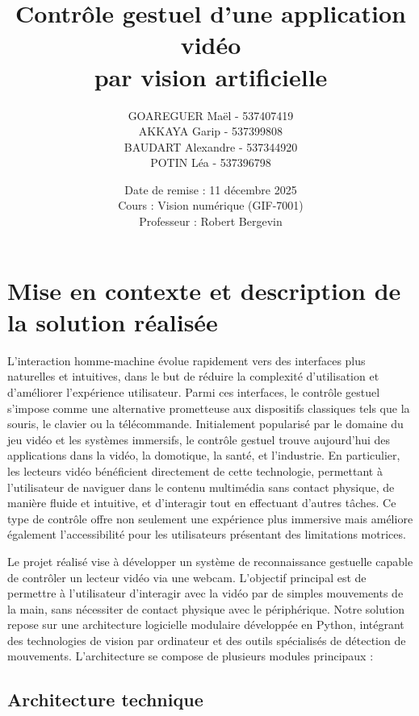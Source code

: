 \documentclass[12pt,a4paper]{article}
\title{%
    \vspace{-2cm}
    \textbf{Contrôle gestuel d'une application vidéo\\par vision artificielle}
    \vspace{0.5cm}
}
\author{%
    GOAREGUER Maël - 537407419\\
    AKKAYA Garip - 537399808\\
    BAUDART Alexandre - 537344920\\
    POTIN Léa - 537396798
}
\date{%
    \vspace{0.5cm}
    Date de remise : 11 décembre 2025\\
    \vspace{0.3cm}
    Cours : Vision numérique (GIF-7001)\\
    Professeur : Robert Bergevin
}
\begin{document}
\maketitle
\thispagestyle{empty}
\newpage

\tableofcontents
\newpage

\section{Mise en contexte et description de la solution réalisée}

L'interaction homme-machine évolue rapidement vers des interfaces plus naturelles et intuitives, dans le but de réduire la complexité d'utilisation et d'améliorer l'expérience utilisateur. Parmi ces interfaces, le contrôle gestuel s'impose comme une alternative prometteuse aux dispositifs classiques tels que la souris, le clavier ou la télécommande. Initialement popularisé par le domaine du jeu vidéo et les systèmes immersifs, le contrôle gestuel trouve aujourd'hui des applications dans la vidéo, la domotique, la santé, et l'industrie. En particulier, les lecteurs vidéo bénéficient directement de cette technologie, permettant à l'utilisateur de naviguer dans le contenu multimédia sans contact physique, de manière fluide et intuitive, et d'interagir tout en effectuant d'autres tâches. Ce type de contrôle offre non seulement une expérience plus immersive mais améliore également l'accessibilité pour les utilisateurs présentant des limitations motrices.

Le projet réalisé vise à développer un système de reconnaissance gestuelle capable de contrôler un lecteur vidéo via une webcam. L'objectif principal est de permettre à l'utilisateur d'interagir avec la vidéo par de simples mouvements de la main, sans nécessiter de contact physique avec le périphérique. Notre solution repose sur une architecture logicielle modulaire développée en Python, intégrant des technologies de vision par ordinateur et des outils spécialisés de détection de mouvements. L'architecture se compose de plusieurs modules principaux :

\subsection{Architecture technique}
\end{document}
